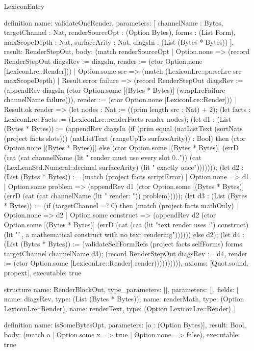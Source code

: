 \begin{lexlean}{LexiconEntry}
\begin{semanticmodule}
definition{
  name: validateOneRender,
  parameters: [
    channelName : Bytes,
    targetChannel : Nat,
    renderSourceOpt : (Option Bytes),
    forms : (List Form),
    maxScopeDepth : Nat,
    surfaceArity : Nat,
    diagsIn : (List (Bytes * Bytes))
  ],
  result: RenderStepOut,
  body: (match renderSourceOpt
    | Option.none => (record RenderStepOut {diagsRev := diagsIn, render := (ctor Option.none [LexiconLre::Render])})
    | Option.some src => (match (LexiconLre::parseLre src maxScopeDepth)
      | Result.error failure => (record RenderStepOut {diagsRev := (appendRev diagsIn (ctor Option.some [(Bytes * Bytes)] (wrapLreFailure channelName failure))), render := (ctor Option.none [LexiconLre::Render])})
      | Result.ok render => (let nodes : Nat := ((prim length src : Nat) + 2); (let facts : LexiconLre::Facts := (LexiconLre::renderFacts render nodes); (let d1 : (List (Bytes * Bytes)) := (appendRev diagsIn (if (prim equal (natListText (sortNats (project facts slots))) (natListText (rangeUpTo surfaceArity)) : Bool) then (ctor Option.none [(Bytes * Bytes)]) else (ctor Option.some [(Bytes * Bytes)] (errD (cat (cat channelName (lit " render must use every slot 0..")) (cat (LexLeanStd.Numeral::decimal surfaceArity) (lit " exactly once"))))))); (let d2 : (List (Bytes * Bytes)) := (match (project facts scriptError)
        | Option.none => d1
        | Option.some problem => (appendRev d1 (ctor Option.some [(Bytes * Bytes)] (errD (cat (cat channelName (lit " render: ")) problem))))); (let d3 : (List (Bytes * Bytes)) := (if (targetChannel =? 0) then (match (project facts mathOnly)
        | Option.none => d2
        | Option.some construct => (appendRev d2 (ctor Option.some [(Bytes * Bytes)] (errD (cat (cat (lit "text render uses `") construct) (lit "`, a mathematical construct with no text rendering")))))) else d2); (let d4 : (List (Bytes * Bytes)) := (validateSelfFormRefs (project facts selfForms) forms targetChannel channelName d3); (record RenderStepOut {diagsRev := d4, render := (ctor Option.some [LexiconLre::Render] render)}))))))))),
  axioms: [Quot.sound, propext],
  executable: true
}

structure{
  name: RenderBlockOut,
  type_parameters: [],
  parameters: [],
  fields: [
    {name: diagsRev, type: (List (Bytes * Bytes))},
    {name: renderMath, type: (Option LexiconLre::Render)},
    {name: renderText, type: (Option LexiconLre::Render)}
  ]
}

definition{
  name: isSomeBytesOpt,
  parameters: [o : (Option Bytes)],
  result: Bool,
  body: (match o | Option.some x => true | Option.none => false),
  executable: true
}


\end{semanticmodule}
\end{lexlean}

